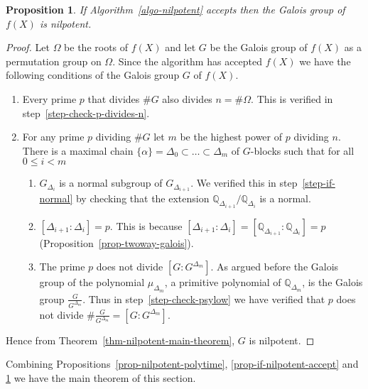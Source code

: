 \documentclass[11pt]{madras}%
\newtheorem{proposition}[theorem]{Proposition}
\theoremstyle{remark}
\begin{document}
\begin{proposition}\label{prop-if-accept-nilpotent}
  If Algorithm~\ref{algo-nilpotent} accepts then the Galois group of
  $f(X)$ is nilpotent.
\end{proposition}
\begin{proof}
  Let $\Omega$ be the roots of $f(X)$ and let $G$ be the Galois group
  of $f(X)$ as a permutation group on $\Omega$.  Since the algorithm
  has accepted $f(X)$ we have the following conditions of the Galois
  group $G$ of $f(X)$.

  \begin{enumerate}
  \item Every prime $p$ that divides $\# G$ also divides $n = \#
    \Omega$. This is verified in step~\ref{step-check-p-divides-n}.
  \item For any prime $p$ dividing $\# G$ let $m$ be the highest power
    of $p$ dividing $n$. There is a maximal chain $\{ \alpha \} =
    \Delta_0 \subset \ldots \subset \Delta_m$ of $G$-blocks such that
    for all $0 \leq i < m$
    \begin{enumerate}
    \item $G_{\Delta_i}$ is a normal subgroup of $G_{\Delta_{i+1}}$.
      We verified this in step~\ref{step-if-normal} by checking that
      the extension $\mathbb{Q}_{\Delta_{i+1}}/\mathbb{Q}_{\Delta_i}$
      is a normal.
    \item $[\Delta_{i+1} : \Delta_i] = p$. This is because
      $[\Delta_{i+1} : \Delta_i] = [\mathbb{Q}_{\Delta_{i+1}}:
      \mathbb{Q}_{\Delta_i}] = p$
      (Proposition~\ref{prop-twoway-galois}).
    \item The prime $p$ does not divide $[G:G^{\Delta_m}]$. As argued
      before the Galois group of the polynomial $\mu_{\Delta_m}$, a
      primitive polynomial of $\mathbb{Q}_{\Delta_m}$, is the Galois
      group $\frac{G}{G^{\Delta_m}}$. Thus in
      step~\ref{step-check-psylow} we have verified that $p$ does not
      divide $\#\frac{G}{G^{\Delta_m}} = [G:G^{\Delta_m}]$.
    \end{enumerate}
  \end{enumerate}

  Hence {from} Theorem~\ref{thm-nilpotent-main-theorem}, $G$ is
  nilpotent.
\end{proof}

Combining Propositions~\ref{prop-nilpotent-polytime},
\ref{prop-if-nilpotent-accept} and \ref{prop-if-accept-nilpotent} we
have the main theorem of this section.
\end{document}
